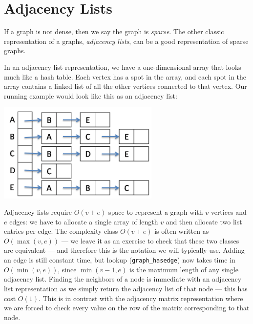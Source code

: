 \section{Adjacency Lists}
\label{sec:graphs:adjlist}

If a graph is not dense, then we say the graph is \emph{sparse}. The other
classic representation of a graphs, \emph{adjacency lists}, can be a good
representation of sparse graphs.

In an adjacency list representation, we have a
one-dimensional array that looks much like a hash table. Each vertex
has a spot in the array, and each spot in the array contains a linked
list of all the other vertices connected to that vertex. Our running
example would look like this as an adjacency list:
\begin{center}
  \includegraphics[width=0.6\textwidth]{img/adj-list.png}
\end{center}

Adjacency lists require $O(v+e)$ space to represent a graph with $v$
vertices and $e$ edges: we have to allocate a single array of length
$v$ and then allocate two list entries per edge.  The complexity class
$O(v+e)$ is often written as $O(\max(v,e))$ --- we leave it as an
exercise to check that these two classes are equivalent --- and
therefore this is the notation we will typically use.  Adding an edge
is still constant time, but lookup (\lstinline'graph_hasedge') now
takes time in $O(\min(v,e))$, since $\min(v-1,e)$ is the maximum
length of any single adjacency list.  Finding the neighbors of a node
is immediate with an adjacency list representation as we simply return
the adjacency list of that node --- this has cost $O(1)$.  This is in
contrast with the adjacency matrix representation where we are forced
to check every value on the row of the matrix corresponding to that
node.

